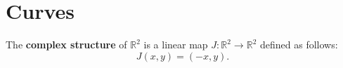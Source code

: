 \documentclass{book}
\begin{document}
	\chapter{Curves}
	
		The \textbf{complex structure} of $\mathbb{R}^2$ is a linear map $J:\mathbb{R}^2\rightarrow\mathbb{R}^2$ defined as follows:
		\begin{equation}
			J(x,y)=(-x,y)\mathrm{.}
		\end{equation} 
\end{document}
